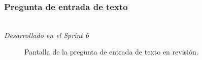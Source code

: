 \newpage

\subsubsection{Pregunta de entrada de texto}\mbox{}\\

\label{sec:pregunic1b}
\textit{Desarrollado en el Sprint 6}
\begin{figure}[H]%
  \centering
  \qquad
  \caption{Pantalla de la pregunta de entrada de texto en revisión.}%
  \label{fig:example}%
\end{figure}

